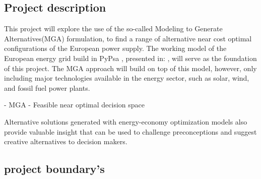 \subsection{Project description}

This project will explore the use of the so-called Modeling to Generate Alternatives(MGA) \cite{MGA} formulation, to find a range of alternative near cost optimal configurations of the European power supply. The working model of the European energy grid build in PyPsa \cite{Pypsa}, presented in: \cite{PypsaModel}, will serve as the foundation of this project. The MGA approach will build on top of this model, however, only including major technologies available in the energy sector, such as solar, wind, and fossil fuel power plants.

- MGA \cite{Brill_MGA_1982}
- Feasible near optimal decision space 


Alternative solutions generated with energy-economy
optimization models also provide valuable insight that can be used to
challenge preconceptions and suggest creative alternatives to decision makers.

\subsection{project boundary's}

